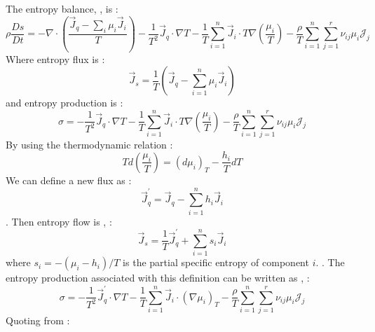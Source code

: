 The entropy balance, , is \cite[Eq.~III.19,][]{DM62}:
\begin{equation}
\rho \frac{Ds}{Dt} = - \nabla \cdot \left( \frac{\vec{J}_q - \sum_i \mu_i \vec{J}_i}{T} \right) - \frac{1}{T^2} \vec{J}_q \cdot \nabla T - \frac{1}{T} \sum_{i=1}^n \vec{J}_i \cdot T \nabla \left( \frac{\mu_i}{T} \right) - \frac{\rho}{T} \sum_{i=1}^n \sum_{j=1}^r \nu_{ij} \mu_i \mathcal{J}_j 
\end{equation}
Where entropy flux is \cite[Eq.~III.20,][]{DM62}:
\begin{equation}
\vec{J}_s = \frac{1}{T} \left( \vec{J}_q - \sum_{i=1}^n \mu_i \vec{J}_i \right)
\end{equation}
and entropy production is \cite[Eq.~III.21,][]{DM62}:
\begin{equation}
\sigma = - \frac{1}{T^2} \vec{J}_q \cdot \nabla T - \frac{1}{T} \sum_{i=1}^n \vec{J}_i \cdot T \nabla \left( \frac{\mu_i}{T} \right)
- \frac{\rho}{T} \sum_{i=1}^n \sum_{j=1}^r \nu_{ij} \mu_i \mathcal{J}_j
\end{equation}
By using the thermodynamic relation \cite[Eq.~III.23,][]{DM62}:
\begin{equation}
T d \left( \frac{\mu_i}{T} \right) = \left( d \mu_i \right)_T - \frac{h_i}{T} dT
\end{equation}
We can define a new flux as \cite[Eq.~III.24,][]{DM62}:
\begin{equation}
\vec{J}_q^\prime = \vec{J}_q - \sum_{i=1}^n h_i \vec{J}_i
\label{eq:Jqprime}
\end{equation}
. 
Then entropy flow is \cite[Eq.~III.26,][]{DM62}, \cite[also Eq.~A5,][]{ABE95}:
\begin{equation}
\vec{J}_s = \frac{1}{T} \vec{J}_q^\prime + \sum_{i=1}^n s_i \vec{J}_i
\label{DM62_ch3_eq26}
\end{equation}
where $s_i = -(\mu_i-h_i)/T$ is the partial specific entropy of component $i$.  .  The entropy production associated with this definition can be written as \cite[Eq.~III.25,][]{DM62}, \cite[also Eq.~A6,][]{ABE95}:
\begin{equation}
\sigma = - \frac{1}{T^2} \vec{J}_q^\prime \cdot \nabla T - \frac{1}{T} \sum_{i=1}^n \vec{J}_i \cdot \left( \nabla \mu_i \right)_T - \frac{\rho}{T} \sum_{i=1}^n \sum_{j=1}^r \nu_{ij} \mu_i \mathcal{J}_j
\label{eq:DM62_ch3_eq25}
\end{equation}
Quoting from \cite{DM62}:\\

